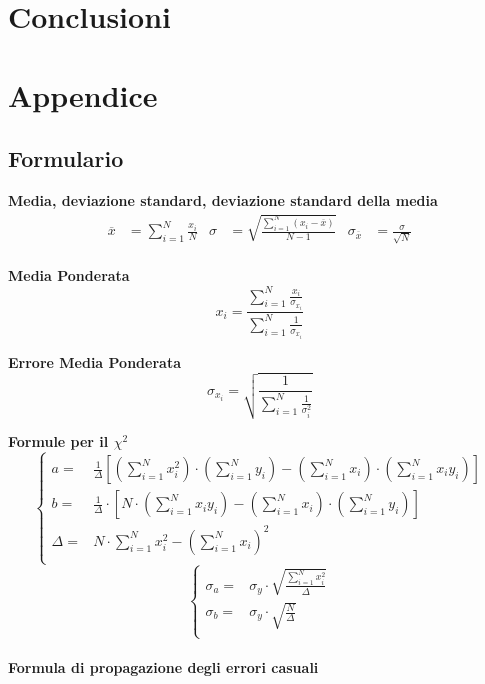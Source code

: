 \documentclass[a4paper,11pt,oneside]{article}
\begin{document}
\section{Conclusioni}

\section{Appendice}

\subsection{Formulario}
\textbf{Media, deviazione standard, deviazione standard della media}
\begin{align*}
        \overline{x}&=\sum\limits_{i=1}^{N} \frac{x_{i}}{N}&
        \sigma&=\sqrt{\frac{\sum\limits_{i=1}^{N} (x_{i}-\overline{x})}{N-1}}&
        \sigma_{\overline{x}}&=\frac{\sigma}{\sqrt{N}}
\end{align*}\\

\textbf{Media Ponderata}
\begin{equation*}
\label{eq:media_pond}
    x_i=\frac{\sum_{i=1}^{N}\frac{x_i}{\sigma_{x_i}}}{\sum_{i=1}^{N}\frac{1}{\sigma_{x_i}}}
\end{equation*}

\textbf{Errore Media Ponderata}
\begin{equation*}
\label{eq:errore_media_pond}
     \sigma_{x_i}=\sqrt{\frac{1}{\sum_{i=1}^{N}\frac{1}{\sigma_{i}^{2}}}}
\end{equation*}

\textbf{Formule per il ${\chi}^2$}
\begin{equation*}
        \begin{cases}
    a=&\frac{1}{\Delta}[(\sum\limits_{i=1}^{N}{x_{i}^{2}})\cdot(\sum\limits_{i=1}^{N}{y_{i}})-(\sum\limits_{i=1}^{N}{x_{i}})\cdot(\sum\limits_{i=1}^{N}{x_{i}y_{i}})] \\ 
    b=&\frac{1}{\Delta }\cdot \left [N\cdot \left ( \sum\limits_{i=1}^{N}x_i y_i \right )-\left ( \sum\limits_{i=1}^{N}x_i \right )\cdot \left ( \sum\limits_{i=1}^{N}y_i \right )  \right ]\\
    \Delta=& N\cdot \sum\limits_{i=1}^{N} x_i^{2} - \left ( \sum\limits_{i=1}^{N}x_i \right )^{2}\\
    \end{cases}
\end{equation*}
\begin{equation*}
    \begin{cases}
    \sigma_{a}=&\sigma_{y}\cdot\sqrt{\frac{\sum_{i=1}^{N}{x_{i}^{2}}}{\Delta}} \\
    \sigma_{b}=&\sigma_y\cdot \sqrt{\frac{N}{\Delta }}\\
    \end{cases}
    \label{equation:err_chi_quadro}
\end{equation*}
\\
\textbf{Formula di propagazione degli errori casuali}\\
\end{document}
